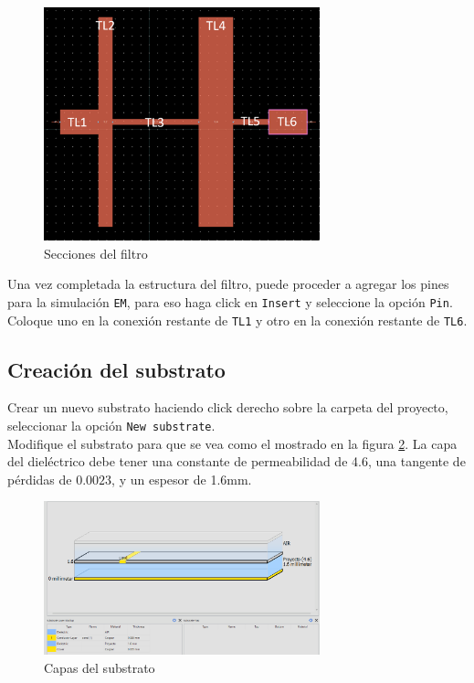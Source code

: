 \begin{figure}[!ht]
    \centering
    \includegraphics[width=8cm]{figures/metodologia/metologia3.png}
    \caption{Secciones del filtro}
    \label{fig:metologia_secciones_filtro}
\end{figure}

Una vez completada la estructura del filtro, puede proceder a agregar los pines para la simulación \texttt{EM}, para eso haga click en \texttt{Insert} y seleccione la opción \texttt{Pin}. Coloque uno en la conexión restante de \texttt{TL1} y otro en la conexión restante de \texttt{TL6}. \\

\subsection{Creación del substrato}

Crear un nuevo substrato haciendo click derecho sobre la carpeta del proyecto, seleccionar la opción \texttt{New substrate}. \\

Modifique el substrato para que se vea como el mostrado en la figura \ref{fig:metologia_substrato}. La capa del dieléctrico debe tener una constante de permeabilidad de 4.6, una tangente de pérdidas de $0.0023$, y un espesor de 1.6mm. \\
\begin{figure}[!ht]
    \centering
    \includegraphics[width=8cm]{figures/metodologia/metologia4.png}
    \caption{Capas del substrato}
    \label{fig:metologia_substrato}
\end{figure}

